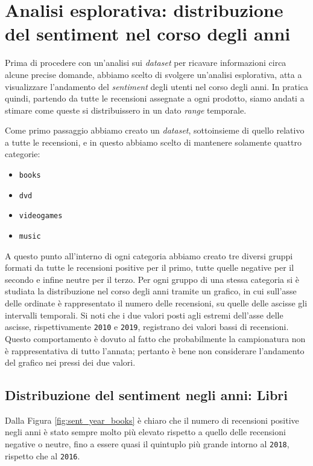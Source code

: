 	\section{Analisi esplorativa: distribuzione del sentiment nel corso degli anni}
		Prima di procedere con un'analisi sui \textit{dataset} per ricavare informazioni circa alcune precise domande, abbiamo scelto di svolgere un'analisi esplorativa, atta a visualizzare l'andamento del \textit{sentiment} degli utenti nel corso degli anni. In pratica quindi, partendo da tutte le recensioni assegnate a ogni prodotto, siamo andati a stimare come queste si distribuissero in un dato \textit{range} temporale. 
		
		Come primo passaggio abbiamo creato un \textit{dataset}, sottoinsieme di quello relativo a tutte le recensioni, e in questo abbiamo scelto di mantenere solamente quattro categorie:
		\begin{itemize}
			\item \texttt{books}
			\item \texttt{dvd}
			\item \texttt{videogames}
			\item \texttt{music}
		\end{itemize}
		
		A questo punto all'interno di ogni categoria abbiamo creato tre diversi gruppi formati da tutte le recensioni positive per il primo, tutte quelle negative per il secondo e infine neutre per il terzo. Per ogni gruppo di una stessa categoria si è studiata la distribuzione nel corso degli anni tramite un grafico, in cui sull'asse delle ordinate è rappresentato il numero delle recensioni, su quelle delle ascisse gli intervalli temporali. Si noti che i due valori posti agli estremi dell'asse delle ascisse, rispettivamente \verb|2010| e \verb|2019|, registrano dei valori bassi di recensioni. Questo comportamento è dovuto al fatto che probabilmente la campionatura non è rappresentativa di tutto l'annata; pertanto è bene non considerare l'andamento del grafico nei pressi dei due valori.
		
		\subsection{Distribuzione del sentiment negli anni: Libri}
			Dalla Figura \ref{fig:sent_year_books} è chiaro che il numero di recensioni positive negli anni è stato sempre molto più elevato rispetto a quello delle recensioni negative o neutre, fino a essere quasi il quintuplo più grande intorno al \verb|2018|, rispetto che al \verb|2016|. 
			
